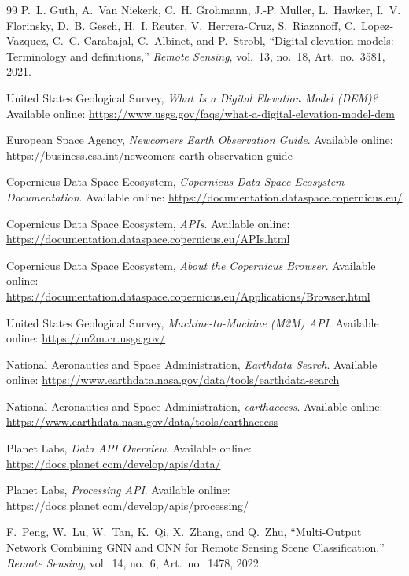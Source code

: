 \documentclass[
    11pt,
    a4paper,
    parskip=half,
    bibliography=totoc,
    numbers=noenddot
]{scrartcl}
\begin{document}
\begin{thebibliography}{99}
P.~L. Guth, A.~Van Niekerk, C.~H. Grohmann, J.-P. Muller,
L.~Hawker, I.~V. Florinsky, D.~B. Gesch, H.~I. Reuter,
V.~Herrera-Cruz, S.~Riazanoff, C.~Lopez-Vazquez,
C.~C. Carabajal, C.~Albinet, and P.~Strobl,
``Digital elevation models: Terminology and definitions,''
\textit{Remote Sensing},
vol.~13, no.~18, Art.~no.~3581, 2021.

United States Geological Survey,
\textit{What Is a Digital Elevation Model (DEM)?}
Available online:
\url{https://www.usgs.gov/faqs/what-a-digital-elevation-model-dem}

European Space Agency,
\textit{Newcomers Earth Observation Guide}.
Available online:
\url{https://business.esa.int/newcomers-earth-observation-guide}

Copernicus Data Space Ecosystem,
\textit{Copernicus Data Space Ecosystem Documentation}.
Available online:
\url{https://documentation.dataspace.copernicus.eu/}

Copernicus Data Space Ecosystem,
\textit{APIs}.
Available online:
\url{https://documentation.dataspace.copernicus.eu/APIs.html}

Copernicus Data Space Ecosystem,
\textit{About the Copernicus Browser}.
Available online:
\url{https://documentation.dataspace.copernicus.eu/Applications/Browser.html}

United States Geological Survey,
\textit{Machine-to-Machine (M2M) API}.
Available online:
\url{https://m2m.cr.usgs.gov/}

National Aeronautics and Space Administration,
\textit{Earthdata Search}.
Available online:
\url{https://www.earthdata.nasa.gov/data/tools/earthdata-search}

National Aeronautics and Space Administration,
\textit{earthaccess}.
Available online:
\url{https://www.earthdata.nasa.gov/data/tools/earthaccess}

Planet Labs,
\textit{Data API Overview}.
Available online:
\url{https://docs.planet.com/develop/apis/data/}

Planet Labs,
\textit{Processing API}.
Available online:
\url{https://docs.planet.com/develop/apis/processing/}

F.~Peng, W.~Lu, W.~Tan, K.~Qi, X.~Zhang, and Q.~Zhu,
``Multi-Output Network Combining GNN and CNN for Remote Sensing Scene Classification,''
\textit{Remote Sensing},
vol.~14, no.~6, Art.~no.~1478, 2022.


\end{thebibliography}
\end{document}
